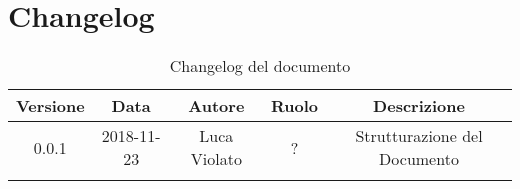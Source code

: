 \section{Changelog}

\begin{center}
\begin{longtable}{|c|c|c|c|c|}
\hline
\textbf{Versione} & \textbf{Data} & \textbf{Autore} & \textbf{Ruolo} & \textbf{Descrizione} \\
\hline \hline
\endfirsthead
0.0.1 & 2018-11-23 & Luca Violato & ? & Strutturazione del Documento \\
\hline
\caption{Changelog del documento}
\end{longtable}
\end{center}